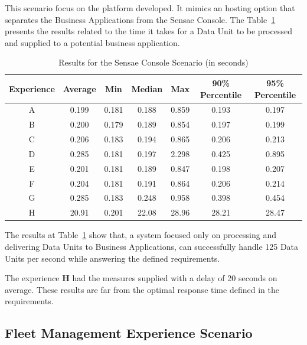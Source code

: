 This scenario focus on the platform developed. It mimics an hosting option that separates the Business Applications from the Sensae Console. The Table~\ref{tab:evaluation:experiences:platform:results} presents the results related to the time it takes for a Data Unit to be processed and supplied to a potential business application.

\begin{table}[H]
    \caption{Results for the Sensae Console Scenario (in seconds)}
    \label{tab:evaluation:experiences:platform:results}
    \centering
    \begin{tabular}{@{}ccccccc@{}}
    \toprule
    \textbf{Experience} & \textbf{Average} & \textbf{Min} & \textbf{Median} & \textbf{Max} & \textbf{90\% Percentile} & \textbf{95\% Percentile} \\ \midrule
    A & 0.199 & 0.181 & 0.188 & 0.859 & 0.193 & 0.197 \\ \midrule
    B & 0.200 & 0.179 & 0.189 & 0.854 & 0.197 & 0.199 \\ \midrule
    C & 0.206 & 0.183 & 0.194 & 0.865 & 0.206 & 0.213 \\ \midrule
    D & 0.285 & 0.181 & 0.197 & 2.298 & 0.425 & 0.895 \\ \midrule
    E & 0.201 & 0.181 & 0.189 & 0.847 & 0.198 & 0.207 \\ \midrule
    F & 0.204 & 0.181 & 0.191 & 0.864 & 0.206 & 0.214 \\ \midrule
    G & 0.285 & 0.183 & 0.248 & 0.958 & 0.398 & 0.454 \\ \midrule
    H & 20.91 & 0.201 & 22.08 & 28.96 & 28.21 & 28.47 \\ \bottomrule
    \end{tabular}
\end{table}

The results at Table~\ref{tab:evaluation:experiences:platform:results} show that, a system focused only on processing and delivering Data Units to Business Applications, can successfully handle 125 Data Units per second while answering the defined requirements.

The experience \textbf{H} had the measures supplied with a delay of 20 seconds on average. These results are far from the optimal response time defined in the requirements.

\subsection{Fleet Management Experience Scenario}
\label{subsec:evaluation:experiences:fleet}

